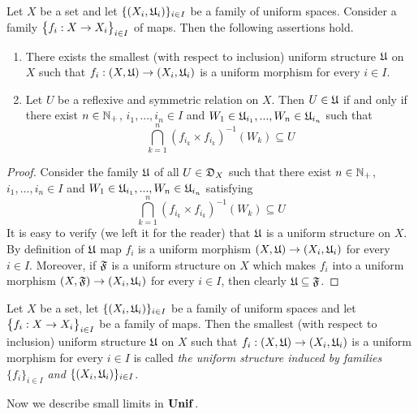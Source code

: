 \begin{proposition}\label{proposition:description_of_uniform_structure_introduced_by_a_family_of_maps}
Let $X$ be a set and let $\{(X_i,{\mathfrak U}_i)\}_{i\in I}$ be a family of uniform spaces. Consider a family $\big\{f_i:X\rightarrow X_i\big\}_{i\in I}$ of maps. Then the following assertions hold.
\begin{enumerate}[label=\emph{\textbf{(\arabic*)}}, leftmargin=*]
\item There exists the smallest (with respect to inclusion) uniform structure ${\mathfrak U}$ on $X$ such that $f_i:\left(X,{\mathfrak U}\right) \rightarrow \left(X_i,{\mathfrak U}_i\right)$ is a uniform morphism for every $i\in I$. 
\item Let $U$ be a reflexive and symmetric relation on $X$. Then $U \in {\mathfrak U}$ if and only if there exist $n\in {\mathbb N}_+$, $i_1,...,i_n\in I$ and $W_1 \in {\mathfrak U}_{i_1},...,W_n\in {\mathfrak U}_{i_n}$ such that
$$\bigcap_{k=1}^n\left(f_{i_k}\times f_{i_k}\right)^{-1}(W_k) \subseteq U$$
\end{enumerate}
\end{proposition}
\begin{proof}
Consider the family ${\mathfrak U}$ of all $U\in {\mathfrak D}_X$ such that there exist $n\in {\mathbb N}_+$, $i_1,...,i_n\in I$ and $W_1 \in {\mathfrak U}_{i_1},...,W_n\in {\mathfrak U}_{i_n}$ satisfying
$$\bigcap_{k=1}^n\left(f_{i_k}\times f_{i_k}\right)^{-1}(W_k) \subseteq U$$
It is easy to verify (we left it for the reader) that ${\mathfrak U}$ is a uniform structure on $X$. By definition of ${\mathfrak U}$ map $f_i$ is a uniform morphism $\left(X,{\mathfrak U}\right) \rightarrow \left(X_i,{\mathfrak U}_i\right)$ for every $i \in I$. Moreover, if ${\mathfrak F}$ is a uniform structure on $X$ which makes $f_i$ into a uniform morphism $\left(X,{\mathfrak F}\right) \rightarrow \left(X_i,{\mathfrak U}_i\right)$ for every $i \in I$, then clearly ${\mathfrak U} \subseteq {\mathfrak F}$.
\end{proof}

\begin{definition}
Let $X$ be a set, let $\{(X_i,{\mathfrak U}_i)\}_{i\in I}$ be a family of uniform spaces and let $\big\{f_i:X\rightarrow X_i\big\}_{i\in I}$ be a family of maps. Then the smallest (with respect to inclusion) uniform structure ${\mathfrak U}$ on $X$ such that $f_i:\left(X,{\mathfrak U}\right) \rightarrow \left(X_i,{\mathfrak U}_i\right)$ is a uniform morphism for every $i\in I$ is called \textit{the uniform structure induced by families $\{f_i\}_{i\in I}$ and $\{(X_i,{\mathfrak U}_i)\}_{i\in I}$}.
\end{definition}
\noindent
Now we describe small limits in $\mathbf{Unif}$.

